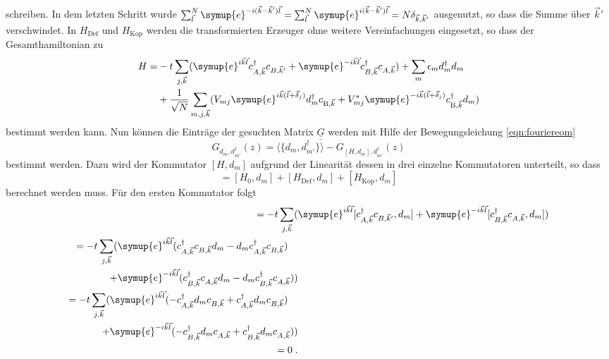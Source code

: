 schreiben.
In dem letzten Schritt wurde $\sum_{\vec{l}}^N \symup{e}^{-i(\vec{k}- \vec{k}')\vec{l}} 
= \sum_{\vec{l}}^N \symup{e}^{i(\vec{k}- \vec{k}')\vec{l}} = N\delta_{\vec{k}, \vec{k}'}$ ausgenutzt, so dass die Summe über $\vec{k}'$ verschwindet.
In $H_\text{Def}$ und $H_\text{Kop}$ werden die transformierten Erzeuger ohne weitere Vereinfachungen eingesetzt,  so dass der Gesamthamiltonian zu 
\begin{equation}
    \begin{split}
        H = &-t \sum_{j, \vec{k}} ( \symup{e}^{i\vec{k}\vec{l}}c^\dagger_{A,\vec{k}} c_{B,\vec{k}'} + 
            \symup{e}^{-i\vec{k}\vec{l}} c^\dagger_{B,\vec{k}}c_{A,\vec{k}}) + \sum_m \epsilon_m d_m^\dagger d_m \\
            &+ \frac{1}{\sqrt{N}}\sum_{m,j,\vec{k}} ( V_{mj}  \symup{e}^{i\vec{k}(\vec{l}+\vec{\delta}_j)} d_m^\dagger c_{\text{B},\vec{k}} 
            + V^*_{mj} \symup{e}^{-i\vec{k}(\vec{l}+\vec{\delta}_j)}c^\dagger_{\text{B},\vec{k}} d_m )
    \end{split}
    \end{equation}
bestimmt werden kann.
Nun können die Einträge der gesuchten Matrix $\underline{\underline{G}}$ werden mit Hilfe der Bewegungsleichung \eqref{eqn:fouriereom} 
\begin{equation*}
    G_{d_m, d_{m'}^\dagger}(z) = \langle \{ d_m, d_{m'}^\dagger \} \rangle - G_{[H,d_m], d_{m'}^\dagger} (z)
\end{equation*}
bestimmt werden.
Dazu wird der Kommutator $[H,d_m]$ aufgrund der Linearität dessen in drei einzelne Kommutatoren unterteilt, so dass
\begin{equation*}
    [H,d_m] = [H_0,d_m] + [H_\text{Def},d_m] +[H_\text{Kop},d_m] 
\end{equation*}
berechnet werden muss.
Für den ersten Kommutator folgt
\begin{align*}
    [H_0,d_m]   = -t \sum_{j, \vec{k}}(&\symup{e}^{i\vec{k}\vec{l}} [c^\dagger_{A,\vec{k}} c_{B,\vec{k}'}, d_m]
                +\symup{e}^{-i\vec{k}\vec{l}} [c^\dagger_{B,\vec{k}}c_{A,\vec{k}}, d_m] ) \\
                \begin{split}
                        = -t \sum_{j, \vec{k}}(&\symup{e}^{i\vec{k}\vec{l}}(c^\dagger_{A,\vec{k}} c_{B,\vec{k}} d_m
                        -d_m c^\dagger_{A,\vec{k}} c_{B,\vec{k}}) \\ 
                        +&\symup{e}^{-i\vec{k}\vec{l}}(c^\dagger_{B,\vec{k}}c_{A,\vec{k}} d_m
                        -d_m c^\dagger_{B,\vec{k}}c_{A,\vec{k}}))
                \end{split}\\
                \begin{split}
                    = -t \sum_{j, \vec{k}}    (&\symup{e}^{i\vec{k}\vec{l}}(-c^\dagger_{A,\vec{k}} d_m c_{B,\vec{k}}
                    + c^\dagger_{A,\vec{k}} d_m  c_{B,\vec{k}}) \\
                    +&\symup{e}^{-i\vec{k}\vec{l}}(-c^\dagger_{B,\vec{k}} d_m c_{A,\vec{k}}
                    + c^\dagger_{B,\vec{k}} d_m  c_{A,\vec{k}}))
                \end{split}\\ 
                = 0\; \text{.}
\end{align*}